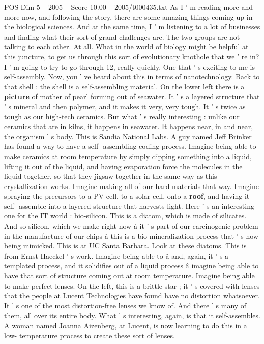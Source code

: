 \begin{textsample}{POS Dim 5 – 2005 – Score 10.00 – 2005/t000435.txt}
As I ' m reading more and more now, and following the story, there are some amazing things coming up in the biological sciences.
And at the same time, I ' m listening to a lot of businesses and finding what their sort of grand challenges are.
The two groups are not talking to each other.
At all.
What in the world of biology might be helpful at this juncture, to get us through this sort of evolutionary knothole that we ' re in?
I ' m going to try to go through 12, really quickly.
One that ' s exciting to me is self-assembly.
Now, you ' ve heard about this in terms of nanotechnology.
Back to that shell : the shell is a self-assembling material.
On the lower left there is a \textbf{picture} of mother of pearl forming out of seawater.
It ' s a layered structure that ' s mineral and then polymer, and it makes it very, very tough.
It ' s twice as tough as our high-tech ceramics.
But what ' s really interesting : unlike our ceramics that are in kilns, it happens in seawater.
It happens near, in and near, the organism ' s body.
This is Sandia National Labs.
A guy named Jeff Brinker has found a way to have a self- assembling coding process.
Imagine being able to make ceramics at room temperature by simply dipping something into a liquid, lifting it out of the liquid, and having evaporation force the molecules in the liquid together, so that they jigsaw together in the same way as this crystallization works.
Imagine making all of our hard materials that way.
Imagine spraying the precursors to a PV cell, to a solar cell, onto a \textbf{roof}, and having it self- assemble into a layered structure that harvests light.
Here ' s an interesting one for the IT world : bio-silicon.
This is a diatom, which is made of silicates.
And so silicon, which we make right now â it ' s part of our carcinogenic problem in the manufacture of our chips â this is a bio-mineralization process that ' s now being mimicked.
This is at UC Santa Barbara.
Look at these diatoms.
This is from Ernst Haeckel ' s work.
Imagine being able to â and, again, it ' s a templated process, and it solidifies out of a liquid process â imagine being able to have that sort of structure coming out at room temperature.
Imagine being able to make perfect lenses.
On the left, this is a brittle star ; it ' s covered with lenses that the people at Lucent Technologies have found have no distortion whatsoever.
It ' s one of the most distortion-free lenses we know of.
And there ' s many of them, all over its entire body.
What ' s interesting, again, is that it self-assembles.
A woman named Joanna Aizenberg, at Lucent, is now learning to do this in a low- temperature process to create these sort of lenses.

\end{textsample}
